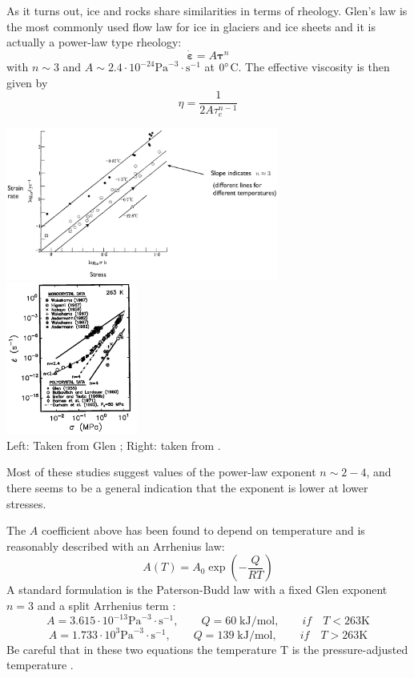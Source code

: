 As it turns out, ice and rocks share similarities in terms of rheology.
Glen’s law is the most commonly used flow law for ice in glaciers and ice sheets \cite{glen55}
and it is actually a power-law type rheology:
\[
\dot{\bm \varepsilon} = A {\bm \tau}^n 
\]
with $n\sim 3$ and $A\sim 2.4\cdot 10^{-24} \text{Pa}^{-3}\cdot \text{s}^{-1}$ at $0\degree$C.
The effective viscosity is then given by
\[
\eta = \frac{1}{2 A \tau_e^{n-1}} 
\]
\begin{center}
\includegraphics[height=5cm]{images/rheology/glen}
\includegraphics[height=5cm]{images/rheology/goko01}\\
{\captionfont Left: Taken from Glen \cite{glen55}; Right: taken from \cite{goko01}.}
\end{center}
Most of these studies suggest values of the power-law exponent $n\sim 2-4$, and there seems to be 
a general indication that the exponent is lower at lower stresses.

The $A$ coefficient above has been found to depend on temperature and is reasonably described 
with an Arrhenius law:
\[
A(T)=A_0 \exp\left( -\frac{Q}{RT} \right)
\]
A standard formulation is the Paterson-Budd law with a fixed Glen exponent $n=3$ and 
a split Arrhenius term \cite{pabu82}:
\[
A=3.615 \cdot 10^{-13} \text{Pa}^{-3}\cdot \text{s}^{-1}, \qquad Q=60 \; \text{kJ}/\text{mol}, \qquad if\quad T<263\text{K} 
\]
\[
A=1.733\cdot 10^{3} \text{Pa}^{-3}\cdot \text{s}^{-1}, \qquad  Q=139 \; \text{kJ}/\text{mol}, \qquad if\quad T>263\text{K}
\]
Be careful that in these two equations the temperature T is the pressure-adjusted temperature \cite{pabu82}.


